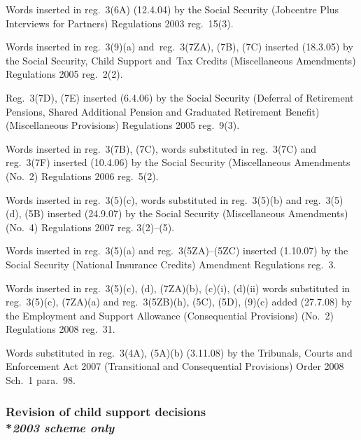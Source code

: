 \documentclass[12pt,a4paper]{article}
\begin{document}
{Words inserted in reg.~3(6A) (12.4.04) by the Social Security (Jobcentre Plus Interviews for Partners) Regulations 2003 reg.~15(3).

Words inserted in reg.~3(9)(a) and~reg.~3(7ZA), (7B), (7C) inserted (18.3.05) by the Social Security, Child Support and~Tax Credits (Miscellaneous Amendments) Regulations 2005 reg.~2(2).

Reg.~3(7D), (7E) inserted (6.4.06) by the Social Security (Deferral of Retirement Pensions, Shared Additional Pension and Graduated Retirement Benefit) (Miscellaneous Provisions) Regulations 2005 reg.~9(3).

Words inserted in reg.~3(7B), (7C), words substituted in reg.~3(7C) and reg.~3(7F) inserted (10.4.06) by the Social Security (Miscellaneous Amendments (No.~2) Regulations 2006 reg.~5(2).

Words inserted in reg.~3(5)(c), words substituted in reg.~3(5)(b) and reg.~3(5)(d), (5B) inserted (24.9.07) by the Social Security (Miscellaneous Amendments) (No.~4) Regulations 2007 reg. 3(2)--(5).

Words inserted in reg.~3(5)(a) and reg.~3(5ZA)--(5ZC) inserted (1.10.07) by the Social Security (National Insurance Credits) Amendment Regulations reg.~3.

Words inserted in reg.~3(5)(c), (d), (7ZA)(b), (c)(i), (d)(ii) words substituted in reg.~3(5)(c), (7ZA)(a) and reg.~3(5ZB)(h), (5C), (5D), (9)(c) added (27.7.08) by the Employment and Support Allowance (Consequential Provisions) (No.~2) Regulations 2008 reg.~31.

Words substituted in reg.~3(4A), (5A)(b) (3.11.08) by the Tribunals, Courts and Enforcement Act 2007 (Transitional and Consequential Provisions) Order 2008 Sch.~1 para.~98.
}

\subsubsection[3A. Revision of child support decisions]{Revision of child support decisions\\*\emph{2003 scheme only}}
\end{document}
